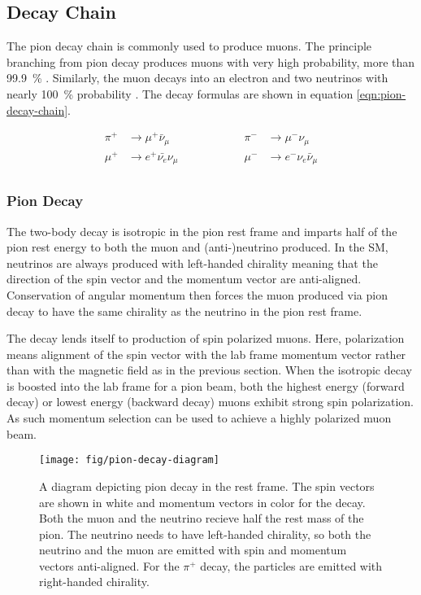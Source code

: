 \subsection{Decay Chain}

The pion decay chain is commonly used to produce muons.  The principle branching from pion decay produces muons with very high probability, more than \SI{99.9}{\percent} \cite{pdg-2016}.  Similarly, the muon decays into an electron and two neutrinos with nearly \SI{100}{\percent} probability \cite{pdg-2016}.  The decay formulas are shown in equation \ref{eqn:pion-decay-chain}.

\begin{equation}
\label{eqn:pion-decay-chain}
\begin{aligned}
\pi^+ & \rightarrow \mu^+ \bar{\nu}_\mu  \hspace{5em} & \pi^- & \rightarrow \mu^- \nu_\mu \\
\mu^+ & \rightarrow e^+ \bar{\nu_e} \nu_\mu  \hspace{5em} & \mu^- & \rightarrow e^- \nu_e \bar{\nu}_\mu\\
\end{aligned}
\end{equation}

\subsubsection{Pion Decay}

The two-body decay is isotropic in the pion rest frame and imparts half of the pion rest energy to both the muon and (anti-)neutrino produced.  In the SM, neutrinos are always produced with left-handed chirality meaning that the direction of the spin vector and the momentum vector are anti-aligned.  Conservation of angular momentum then forces the muon produced via pion decay to have the same chirality as the neutrino in the pion rest frame.  

The decay lends itself to production of spin polarized muons.  Here, polarization means alignment of the spin vector with the lab frame momentum vector rather than with the magnetic field as in the previous section.  When the isotropic decay is boosted into the lab frame for a pion beam, both the highest energy (forward decay) or lowest energy (backward decay) muons exhibit strong spin polarization.  As such momentum selection can be used to achieve a highly polarized muon beam. 

\begin{figure}
\centering
\texttt{[image: fig/pion-decay-diagram]}
\caption{
    A diagram depicting pion decay in the rest frame.  The spin vectors are shown in white and momentum vectors in color for the decay.  Both the muon and the neutrino recieve half the rest mass of the pion.  The neutrino needs to have left-handed chirality, so both the neutrino and the muon are emitted with spin and momentum vectors anti-aligned.  For the $\pi^+$ decay, the particles are emitted with right-handed chirality.
    \label{fig:muon-decay-diagram}
}
\end{figure}

